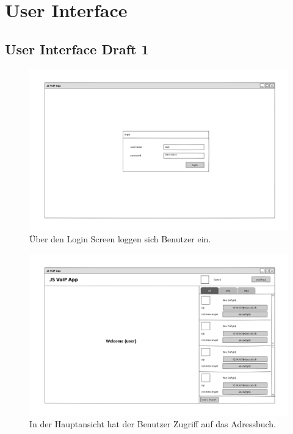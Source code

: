 \chapter{User Interface}

\section{User Interface Draft 1}
	\label{uiDrafts} 

	\begin{figure}[H]
		\centering
		\includegraphics[height=0.3\textheight]{../ui/img/uiDraft1/login_page.png}
		\caption[Login screen draft1]{Über den Login Screen loggen sich Benutzer ein.}
		\label{login screen}
	\end{figure}
	\begin{figure}[H]
		\centering
		\includegraphics[height=0.3\textheight]{../ui/img/uiDraft1/main_view.png}
		\caption[Main screen draft1]{In der Hauptansicht hat der Benutzer Zugriff auf das Adressbuch.}
		\label{main screen}
	\end{figure}
